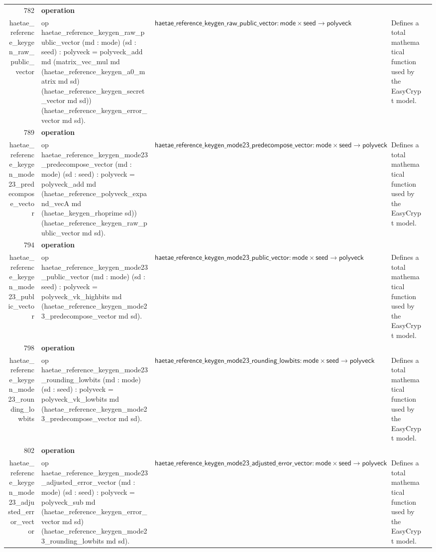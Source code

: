 \documentclass[10pt]{article}
\newcommand{\ec}[1]{\begingroup\ttfamily\scriptsize #1\endgroup}
\begin{document}
\begin{longtable}{r L{0.17\textwidth} L{0.26\textwidth} L{0.27\textwidth} L{0.20\textwidth}}
782 & \textbf{operation}\\\ec{haetae\_reference\_keygen\_raw\_public\_vector} & \ec{op haetae\_reference\_keygen\_raw\_public\_vector (md : mode) (sd : seed) : polyveck = polyveck\_add md (matrix\_vec\_mul md (haetae\_reference\_keygen\_a0\_matrix md sd) (haetae\_reference\_keygen\_secret\_vector md sd)) (haetae\_reference\_keygen\_error\_vector md sd).} & \(\mathsf{haetae\_reference\_keygen\_raw\_public\_vector} : \mathsf{mode} \times \mathsf{seed} \to \mathsf{polyveck}\) & Defines a total mathematical function used by the EasyCrypt model. \\
789 & \textbf{operation}\\\ec{haetae\_reference\_keygen\_mode23\_predecompose\_vector} & \ec{op haetae\_reference\_keygen\_mode23\_predecompose\_vector (md : mode) (sd : seed) : polyveck = polyveck\_add md (haetae\_reference\_polyveck\_expand\_vecA md (haetae\_keygen\_rhoprime sd)) (haetae\_reference\_keygen\_raw\_public\_vector md sd).} & \(\mathsf{haetae\_reference\_keygen\_mode23\_predecompose\_vector} : \mathsf{mode} \times \mathsf{seed} \to \mathsf{polyveck}\) & Defines a total mathematical function used by the EasyCrypt model. \\
794 & \textbf{operation}\\\ec{haetae\_reference\_keygen\_mode23\_public\_vector} & \ec{op haetae\_reference\_keygen\_mode23\_public\_vector (md : mode) (sd : seed) : polyveck = polyveck\_vk\_highbits md (haetae\_reference\_keygen\_mode23\_predecompose\_vector md sd).} & \(\mathsf{haetae\_reference\_keygen\_mode23\_public\_vector} : \mathsf{mode} \times \mathsf{seed} \to \mathsf{polyveck}\) & Defines a total mathematical function used by the EasyCrypt model. \\
798 & \textbf{operation}\\\ec{haetae\_reference\_keygen\_mode23\_rounding\_lowbits} & \ec{op haetae\_reference\_keygen\_mode23\_rounding\_lowbits (md : mode) (sd : seed) : polyveck = polyveck\_vk\_lowbits md (haetae\_reference\_keygen\_mode23\_predecompose\_vector md sd).} & \(\mathsf{haetae\_reference\_keygen\_mode23\_rounding\_lowbits} : \mathsf{mode} \times \mathsf{seed} \to \mathsf{polyveck}\) & Defines a total mathematical function used by the EasyCrypt model. \\
802 & \textbf{operation}\\\ec{haetae\_reference\_keygen\_mode23\_adjusted\_error\_vector} & \ec{op haetae\_reference\_keygen\_mode23\_adjusted\_error\_vector (md : mode) (sd : seed) : polyveck = polyveck\_sub md (haetae\_reference\_keygen\_error\_vector md sd) (haetae\_reference\_keygen\_mode23\_rounding\_lowbits md sd).} & \(\mathsf{haetae\_reference\_keygen\_mode23\_adjusted\_error\_vector} : \mathsf{mode} \times \mathsf{seed} \to \mathsf{polyveck}\) & Defines a total mathematical function used by the EasyCrypt model. \\

\end{longtable}
\end{document}
